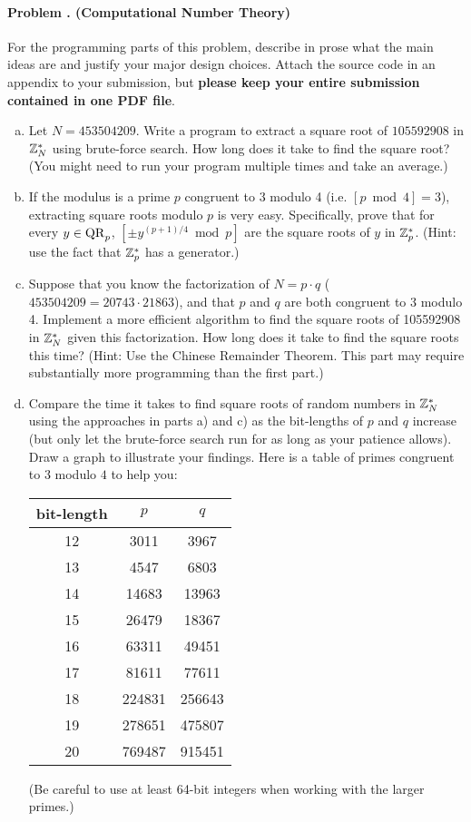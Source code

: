 \documentclass[11pt]{article}
\newcounter{problem}
\newenvironment{problem}[1]{\stepcounter{problem}
\paragraph{Problem \theproblem. #1}}{}
\begin{document}
\begin{problem}{(Computational Number Theory)}
For the programming parts of this problem, describe in prose what the main ideas are and justify your major design choices. Attach the source code in an appendix to your submission, but \textbf{please keep your entire submission contained in one PDF file}.


\begin{enumerate}[a)]
\item Let $N=453504209$. Write a program to extract a square root of $105592908$ in ${\mathbb Z}_N^*$ using brute-force search. How long does it take to find the square root? (You might need to run your program multiple times and take an average.)

\item If the modulus is a prime $p$ congruent to 3 modulo 4 (i.e. $[p\bmod 4]=3$), extracting square roots modulo $p$ is very easy.  Specifically, prove that for every $y\in \mathrm{QR}_p$, $[\pm y^{(p+1)/4} \bmod p]$ are the square roots of $y$ in ${\mathbb Z}_p^*$. (Hint: use the fact that ${\mathbb Z}_p^*$ has a generator.)

\item Suppose that you know the factorization of $N=p\cdot q$ ($453504209=20743\cdot21863$), and that $p$ and $q$ are both congruent to 3 modulo 4.  Implement a more efficient algorithm to find the square roots of 105592908 in ${\mathbb Z}_N^*$ given this factorization. How long does it take to find the square roots this time?
(Hint: Use the Chinese Remainder Theorem.  This part may require substantially more programming than the first part.)

\item Compare the time it takes to find square roots of random numbers in ${\mathbb Z}_N^*$ using the approaches in parts a) and c) as the bit-lengths of $p$ and $q$ increase (but only let the brute-force search run for as long as your patience allows). Draw a graph to illustrate your findings. Here is a table of primes congruent to $3$ modulo $4$ to help you:
\begin{center}
\begin{tabular}{c|c|c}
bit-length & $p$ & $q$ \\
\hline
12 & 3011 & 3967 \\
13 & 4547 & 6803 \\
14 & 14683 & 13963 \\
15 & 26479 & 18367 \\
16 & 63311 & 49451 \\
17 & 81611 & 77611 \\
18 & 224831 & 256643 \\
19 & 278651 & 475807 \\
20 & 769487 & 915451 \\
\end{tabular}
\end{center}
(Be careful to use at least 64-bit integers when working with the larger primes.)


\end{enumerate}
\end{problem}
\end{document}
